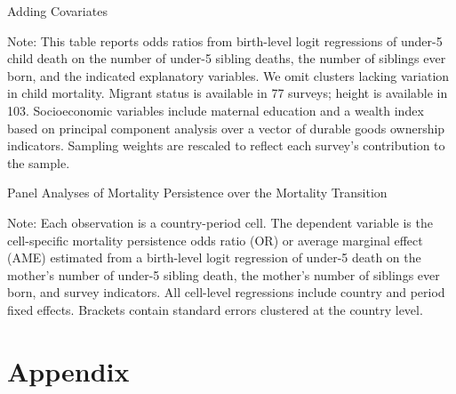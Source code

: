 \documentclass[12pt,english]{article}
\begin{document}

\begin{table}[t]
\begin{center}
\caption{Adding Covariates}
\label{table:mediators}

\subfloat[A. All]{
{\resizebox{0.5\textwidth}{!}{}}
}
\par
{}
\par
\subfloat[C. Height]{
{\resizebox{0.5\textwidth}{!}{}}
}

\end{center}
\footnotesize{Note: This table reports odds ratios from birth-level logit regressions of under-5 child death on the number of under-5 sibling deaths, the number of siblings ever born, and the indicated explanatory variables. We omit clusters lacking variation in child mortality. Migrant status is available in 77 surveys; height is available in 103. Socioeconomic variables include maternal education and a wealth index based on principal component analysis over a vector of durable goods ownership indicators. Sampling weights are rescaled to reflect each survey's contribution to the sample.}
\end{table}

\begin{table}
\begin{center}
\caption{Panel Analyses of Mortality Persistence over the Mortality Transition}
\label{table:panel}
\resizebox{\textwidth}{!}{

}
\end{center}
\footnotesize{Note: Each observation is a country-period cell. The dependent variable is the cell-specific mortality persistence odds ratio (OR) or average marginal effect (AME) estimated from a birth-level logit regression of under-5 death on the mother's number of under-5 sibling death, the mother's number of siblings ever born, and survey indicators. All cell-level regressions include country and period fixed effects. Brackets contain standard errors clustered at the country level.}
\end{table}

\FloatBarrier
\section{Appendix}
\renewcommand\thetable{A.\arabic{table}}    
\setcounter{table}{0}  
\end{document}
